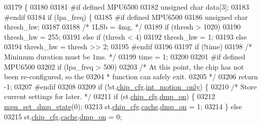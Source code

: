 \begin{DoxyCode}
03179 \{
03180 
03181 \textcolor{preprocessor}{#if defined MPU6500}
03182     \textcolor{keywordtype}{unsigned} \textcolor{keywordtype}{char} data[3];
03183 \textcolor{preprocessor}{#endif}
03184     \textcolor{keywordflow}{if} (lpa\_freq) \{
03185 \textcolor{preprocessor}{#if defined MPU6500}
03186         \textcolor{keywordtype}{unsigned} \textcolor{keywordtype}{char} thresh\_hw;
03187 
03188         \textcolor{comment}{/* 1LSb = 4mg. */}
03189         \textcolor{keywordflow}{if} (thresh > 1020)
03190             thresh\_hw = 255;
03191         \textcolor{keywordflow}{else} \textcolor{keywordflow}{if} (thresh < 4)
03192             thresh\_hw = 1;
03193         \textcolor{keywordflow}{else}
03194             thresh\_hw = thresh >> 2;
03195 \textcolor{preprocessor}{#endif}
03196 
03197         \textcolor{keywordflow}{if} (!time)
03198             \textcolor{comment}{/* Minimum duration must be 1ms. */}
03199             time = 1;
03200 
03201 \textcolor{preprocessor}{#if defined MPU6500}
03202         \textcolor{keywordflow}{if} (lpa\_freq > 500)
03203             \textcolor{comment}{/* At this point, the chip has not been re-configured, so the}
03204 \textcolor{comment}{             * function can safely exit.}
03205 \textcolor{comment}{             */}
03206             \textcolor{keywordflow}{return} -1;
03207 \textcolor{preprocessor}{#endif}
03208 
03209         \textcolor{keywordflow}{if} (!st.\hyperlink{structgyro__state__s_ac895217592e2084bd520b0be8e9d20ee}{chip\_cfg}.\hyperlink{structchip__cfg__s_a28c5c373e0d7189a11c4ae5ca351ca30}{int\_motion\_only}) \{
03210             \textcolor{comment}{/* Store current settings for later. */}
03211             \textcolor{keywordflow}{if} (st.\hyperlink{structgyro__state__s_ac895217592e2084bd520b0be8e9d20ee}{chip\_cfg}.\hyperlink{structchip__cfg__s_a49fb51079238683b21264827348b5968}{dmp\_on}) \{
03212                 \hyperlink{group___d_r_i_v_e_r_s_ga68ed20e6c9663cd7c50469329af8715f}{mpu\_set\_dmp\_state}(0);
03213                 st.\hyperlink{structgyro__state__s_ac895217592e2084bd520b0be8e9d20ee}{chip\_cfg}.\hyperlink{structchip__cfg__s_aab21a113d97da9c015f6f1928662927b}{cache}.\hyperlink{structmotion__int__cache__s_a49fb51079238683b21264827348b5968}{dmp\_on} = 1;
03214             \} \textcolor{keywordflow}{else}
03215                 st.\hyperlink{structgyro__state__s_ac895217592e2084bd520b0be8e9d20ee}{chip\_cfg}.\hyperlink{structchip__cfg__s_aab21a113d97da9c015f6f1928662927b}{cache}.\hyperlink{structmotion__int__cache__s_a49fb51079238683b21264827348b5968}{dmp\_on} = 0;

\end{DoxyCode}
